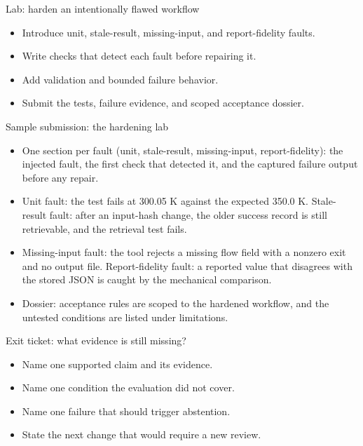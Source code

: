 \documentclass[aspectratio=169,11pt]{beamer}
\begin{document}
\begin{frame}[t,fragile]{Lab: harden an intentionally flawed workflow}
\fontsize{11.5}{14}\selectfont
\begin{itemize}\setlength{\itemsep}{2mm}
\item Introduce unit, stale-result, missing-input, and report-fidelity faults.
\item Write checks that detect each fault before repairing it.
\item Add validation and bounded failure behavior.
\item Submit the tests, failure evidence, and scoped acceptance dossier.
\end{itemize}
\end{frame}
\begin{frame}[t,fragile]{Sample submission: the hardening lab}
\fontsize{11.5}{14}\selectfont
\begin{itemize}\setlength{\itemsep}{2mm}
\item One section per fault (unit, stale-result, missing-input, report-fidelity): the injected fault, the first check that detected it, and the captured failure output before any repair.
\item Unit fault: the test fails at 300.05 K against the expected 350.0 K. Stale-result fault: after an input-hash change, the older success record is still retrievable, and the retrieval test fails.
\item Missing-input fault: the tool rejects a missing flow field with a nonzero exit and no output file. Report-fidelity fault: a reported value that disagrees with the stored JSON is caught by the mechanical comparison.
\item Dossier: acceptance rules are scoped to the hardened workflow, and the untested conditions are listed under limitations.
\end{itemize}
\end{frame}
\begin{frame}[t,fragile]{Exit ticket: what evidence is still missing?}
\fontsize{11.5}{14}\selectfont
\begin{itemize}\setlength{\itemsep}{2mm}
\item Name one supported claim and its evidence.
\item Name one condition the evaluation did not cover.
\item Name one failure that should trigger abstention.
\item State the next change that would require a new review.
\end{itemize}
\end{frame}
\end{document}
